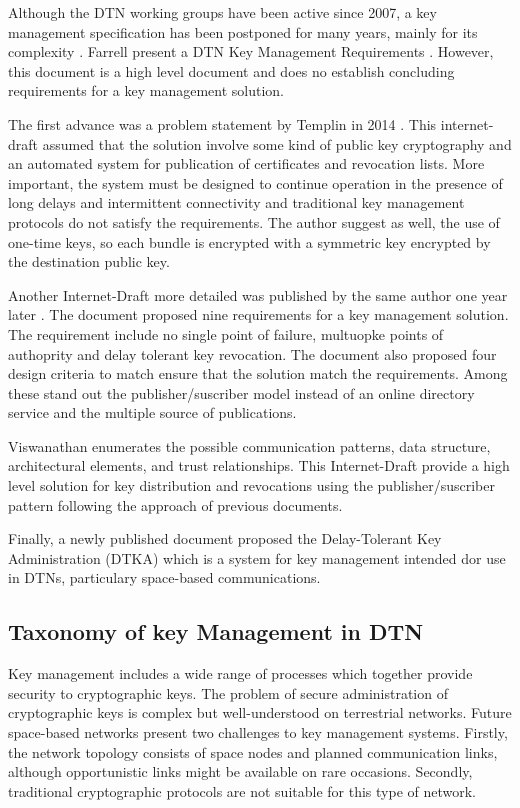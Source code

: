 Although the DTN working groups have been active since 2007, a key management specification has been postponed for many years, mainly for its complexity \cite{rfc6257}. Farrell present a DTN Key Management Requirements \cite{farrell-dtnrg-km-00}. However, this document is a high level document and does no establish concluding requirements for a key management solution. 


The first advance was a problem statement by Templin in 2014  \cite{templin-dtnskmps-00}. This internet-draft assumed that the solution involve some kind of public key cryptography and an automated system for publication of certificates and revocation lists. More important, the system must be designed to continue operation in the presence of long delays and intermittent connectivity and traditional key management protocols do not satisfy the requirements. The author suggest as well, the use of one-time keys, so each bundle is encrypted with a symmetric key encrypted by the destination public key. 

Another Internet-Draft more detailed was published by the same author one year later \cite{templin-dtnskmreq-00}. The document proposed nine requirements for a key management solution. The requirement include no single point of failure, multuopke points of authoprity and delay tolerant key revocation. The document also proposed four design criteria to match ensure that the solution match the requirements. Among these stand out the publisher/suscriber model instead of an online directory service and the multiple source of publications. 

Viswanathan \cite{viswanathan-dtn-pkdn-00} enumerates the possible communication patterns, data structure, architectural elements, and trust relationships.  This Internet-Draft provide a high level solution for key distribution and revocations using the publisher/suscriber pattern following the approach of previous documents.

Finally, a newly published document proposed the Delay-Tolerant Key Administration (DTKA) which is a system for key management intended dor use in DTNs, particulary space-based communications. 

\subsection{Taxonomy of key Management in DTN}

Key management includes a wide range of processes which together provide security to cryptographic keys.  The problem of secure administration of cryptographic keys is complex but well-understood on terrestrial networks. Future space-based networks present two challenges to key management systems. Firstly, the network topology consists of space nodes and planned communication links, although opportunistic links might be available on rare occasions. Secondly, traditional cryptographic protocols are not suitable for this type of network. 






